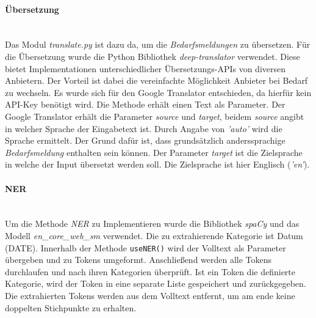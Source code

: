 \paragraph{Übersetzung}\mbox{}\\
Das Modul \emph{translate.py} ist dazu da, um die \emph{Bedarfsmeldungen} zu übersetzen. Für die Übersetzung wurde die Python Bibliothek \emph{deep-translator} verwendet. Diese bietet Implementationen unterschiedlicher Übersetzungs-APIs von diversen Anbietern. Der Vorteil ist dabei die vereinfachte Möglichkeit Anbieter bei Bedarf zu wechseln.
%	
Es wurde sich für den Google Translator entschieden, da hierfür kein API-Key benötigt wird. Die Methode erhält einen Text als Parameter. Der Google Translator erhält die Parameter \emph{source} und \emph{target}, beidem \emph{source} angibt in welcher Sprache der Eingabetext ist. Durch Angabe von \emph{'auto'} wird die Sprache ermittelt. Der Grund dafür ist, dass grundsätzlich anderssprachige \emph{Bedarfsmeldung} enthalten sein können. Der Parameter \emph{target} ist die Zielsprache in welche der Input übersetzt werden soll. Die Zielsprache ist hier Englisch (\emph{'en'}).
\paragraph{NER}\mbox{}\\
Um die Methode \emph{NER} zu Implementieren wurde die Bibliothek \emph{spaCy} und das Modell \emph{en\_core\_web\_sm} verwendet. 
Die zu extrahierende Kategorie ist Datum (DATE). Innerhalb der Methode \lstinline{useNER()} wird der Volltext als Parameter übergeben und zu Tokens umgeformt. Anschließend werden alle Tokens durchlaufen und nach ihren Kategorien überprüft. Ist ein Token die definierte Kategorie, wird der Token in eine separate Liste gespeichert und zurückgegeben. Die extrahierten Tokens werden aus dem Volltext entfernt, um am ende keine doppelten Stichpunkte zu erhalten.
